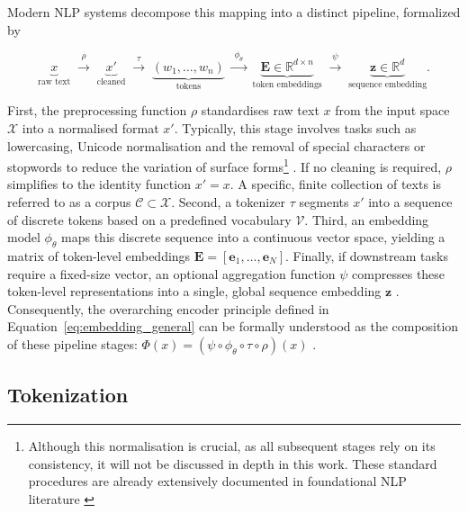 Modern \ac{NLP} systems decompose this mapping into a distinct pipeline, formalized by 

\begin{equation}
    \underbrace{x}_{\text{raw text}} 
    \;\xrightarrow{\rho}\; 
    \underbrace{x'}_{\text{cleaned}} 
    \;\xrightarrow{\;\tau\;}\; 
    \underbrace{(w_1, \ldots, w_n)}_{\text{tokens}} 
    \;\xrightarrow{\;\phi_\theta\;}\; 
    \underbrace{\mathbf{E} \in \mathbb{R}^{d \times n}}_{\text{token embeddings}}
    \;\xrightarrow{\;\psi\;}\; 
    \underbrace{\mathbf{z} \in \mathbb{R}^{d}}_{\text{sequence embedding}} .
    \label{eq:text_pipeline}
\end{equation}

First, the preprocessing function $\rho$ standardises raw text $x$ from the input space $\mathcal{X}$ into a normalised format $x'$. Typically, this stage involves tasks such as lowercasing, Unicode normalisation and the removal of special characters or stopwords to reduce the variation of surface forms\footnote{Although this normalisation is crucial, as all subsequent stages rely on its consistency, it will not be discussed in depth in this work. These standard procedures are already extensively documented in foundational \ac{NLP} literature \cite[p. 13 f.]{Jurafsky2024_SLP}} \cite[p. 4 f., p.~243]{Jurafsky2024_SLP}. If no cleaning is required, $\rho$ simplifies to the identity function $x' = x$. A specific, finite collection of texts is referred to as a corpus $\mathcal{C} \subset \mathcal{X}$. Second, a tokenizer $\tau$ segments $x'$ into a sequence of discrete tokens based on a predefined vocabulary $\mathcal{V}$. Third, an embedding model $\phi_\theta$ maps this discrete sequence into a continuous vector space, yielding a matrix of token-level embeddings $\mathbf{E} = [\mathbf{e}_1, \dots, \mathbf{e}_N]$. Finally, if downstream tasks require a fixed-size vector, an optional aggregation function $\psi$ compresses these token-level representations into a single, global sequence embedding $\mathbf{z}$ \cite{reimers2019sentence}. Consequently, the overarching encoder principle defined in Equation~\ref{eq:embedding_general} can be formally understood as the composition of these pipeline stages: $\Phi(x) = (\psi \circ \phi_\theta \circ \tau \circ \rho)(x)$ \cite{Jurafsky2024_SLP, manning2008introduction}.


\subsection{Tokenization}
\label{sec:tokenization}

